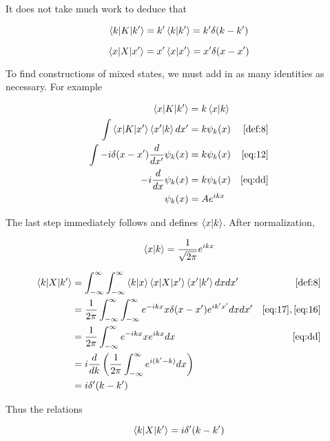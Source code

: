 \documentclass{tufte-book}
\newcommand{\infint}{\int^{\infty}_{-\infty}}
\begin{document}
It does not take much work to deduce that

\begin{equation}
	\label{eq:15}
	\braket{k|K|k'} = k'\braket{k|k'} = k'\delta(k-k')
\end{equation}

\begin{equation}
	\label{eq:16}
	\braket{x|X|x'} = x'\braket{x|x'} = x'\delta(x-x')
\end{equation}

To find constructions of mixed states, we must add in as many identities as necessary. For example

\begin{align*}
	\braket{x|K|k'} &= k\braket{x|k}\\
	\int\braket{x|K|x'}\braket{x'|k}dx'       & = k\psi_k(x) & \ref{def:8} \\
	\int -i\delta(x-x')\frac{d}{dx'}\psi_k(x) & = k\psi_k(x) & \ref{eq:12} \\
	-i\frac{d}{dx}\psi_k(x)                   & = k\psi_k(x) & \ref{eq:dd} \\
	\psi_k(x) &= Ae^{ikx}
\end{align*}

The last step immediately follows and defines $\braket{x|k}$. After normalization,

\begin{equation}
	\label{eq:17}
	\braket{x|k} = \frac{1}{\sqrt{2\pi}}e^{ikx}
\end{equation}

\begin{align*}
	\braket{k|X|k'} & = \infint\infint\braket{k|x}\braket{x|X|x'}\braket{x'|k'}dxdx'     & \ref{def:8}              \\
	                & = \frac{1}{2\pi}\infint\infint e^{-ikx}x\delta(x-x')e^{ik'x'}dxdx' & \ref{eq:17}, \ref{eq:16} \\
	                & = \frac{1}{2\pi}\infint e^{-ikx}xe^{ikx}dx                         & \ref{eq:dd}              \\
	&= i\frac{d}{dk}\left(\frac{1}{2\pi}\infint e^{i(k'-k)}dx\right) \\
	&= i\delta'(k-k')
\end{align*}

Thus the relations

\begin{equation}
	\label{eq:18}
	\braket{k|X|k'} = i\delta'(k-k')
\end{equation}
\end{document}

